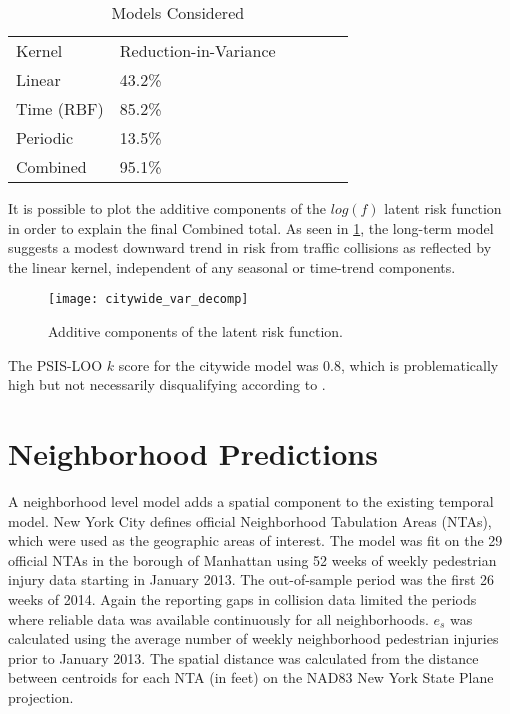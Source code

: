 \begin{table}[h!]
\centering
\caption{Models Considered}
\label{variance_citywide}
\begin{tabular}{@{}llllll@{}}
\toprule
Kernel     & Reduction-in-Variance &  \\
Linear     & 43.2\%                &  \\
Time (RBF) & 85.2\%                &  \\
Periodic   & 13.5\%                &  \\
Combined   & 95.1\%                &
\end{tabular}
\end{table}

It is possible to plot the additive components of the $log(f)$ latent risk function in order to explain the final Combined total. As seen in \ref{citywide_var_decomp}, the long-term model suggests a modest downward trend in risk from traffic collisions as reflected by the linear kernel, independent of any seasonal or time-trend components. \par

\begin{figure}[h!]
  \centering
  \caption{Additive components of the latent risk function.}
  \label{citywide_var_decomp}
  \texttt{[image: citywide\_var\_decomp]}
\end{figure}

The PSIS-LOO $k$ score for the citywide model was 0.8, which is problematically high but not necessarily disqualifying according to \cite{vehtari_loo}.

 \section{Neighborhood Predictions}

 A neighborhood level model adds a spatial component to the existing temporal model.  New York City defines official Neighborhood Tabulation Areas (NTAs), which were used as the geographic areas of interest. The model was fit on the 29 official NTAs in the borough of Manhattan using 52 weeks of weekly pedestrian injury data starting in January 2013. The out-of-sample period was the first 26 weeks of 2014. Again the reporting gaps in collision data limited the periods where reliable data was available continuously for all neighborhoods. $e_s$ was calculated using the average number of weekly neighborhood pedestrian injuries prior to January 2013.  The spatial distance was calculated from the distance between centroids for each NTA (in feet) on the NAD83 New York State Plane projection. \par

